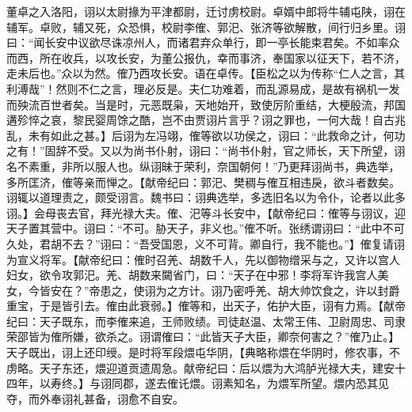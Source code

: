 \documentclass[12pt,UTF8]{ctexbook}
\begin{document}
董卓之入洛阳，诩以太尉掾为平津都尉，迁讨虏校尉。卓婿中郎将牛辅屯陕，诩在辅军。卓败，辅又死，众恐惧，校尉李傕、郭汜、张济等欲解散，间行归乡里。诩曰：“闻长安中议欲尽诛凉州人，而诸君弃众单行，即一亭长能束君矣。不如率众而西，所在收兵，以攻长安，为董公报仇，幸而事济，奉国家以征天下，若不济，走未后也。”众以为然。傕乃西攻长安。语在卓传。【臣松之以为传称“仁人之言，其利溥哉”！然则不仁之言，理必反是。夫仁功难着，而乱源易成，是故有祸机一发而殃流百世者矣。当是时，元恶既枭，天地始开，致使厉阶重结，大梗殷流，邦国遘殄悴之哀，黎民婴周馀之酷，岂不由贾诩片言乎？诩之罪也，一何大哉！自古兆乱，未有如此之甚。】后诩为左冯翊，傕等欲以功侯之，诩曰：“此救命之计，何功之有！”固辞不受。又以为尚书仆射，诩曰：“尚书仆射，官之师长，天下所望，诩名不素重，非所以服人也。纵诩昧于荣利，奈国朝何！”乃更拜诩尚书，典选举，多所匡济，傕等亲而惮之。【献帝纪曰：郭汜、樊稠与傕互相违戾，欲斗者数矣。诩辄以道理责之，颇受诩言。魏书曰：诩典选举，多选旧名以为令仆，论者以此多诩。】会母丧去官，拜光禄大夫。傕、汜等斗长安中，【献帝纪曰：傕等与诩议，迎天子置其营中。诩曰：“不可。胁天子，非义也。”傕不听。张绣谓诩曰：“此中不可久处，君胡不去？”诩曰：“吾受国恩，义不可背。卿自行，我不能也。”】傕复请诩为宣义将军。【献帝纪曰：傕时召羌、胡数千人，先以御物缯采与之，又许以宫人妇女，欲令攻郭汜。羌、胡数来闚省门，曰：“天子在中邪！李将军许我宫人美女，今皆安在？”帝患之，使诩为之方计。诩乃密呼羌、胡大帅饮食之，许以封爵重宝，于是皆引去。傕由此衰弱。】傕等和，出天子，佑护大臣，诩有力焉。【献帝纪曰：天子既东，而李傕来追，王师败绩。司徒赵温、太常王伟、卫尉周忠、司隶荣邵皆为傕所嫌，欲杀之。诩谓傕曰：“此皆天子大臣，卿奈何害之？”傕乃止。】天子既出，诩上还印绶。是时将军段煨屯华阴，【典略称煨在华阴时，修农事，不虏略。天子东还，煨迎道贡遗周急。献帝纪曰：后以煨为大鸿胪光禄大夫，建安十四年，以寿终。】与诩同郡，遂去傕讬煨。诩素知名，为煨军所望。煨内恐其见夺，而外奉诩礼甚备，诩愈不自安。
\end{document}
